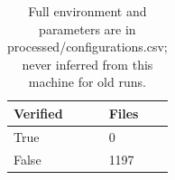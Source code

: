 \begin{table}[htbp]
\centering
\caption{Full environment and parameters are in processed/configurations.csv; never inferred from this machine for old runs.}
\label{tab:configuration-coverage}
\begin{tabular}{ll}
\hline
Verified & Files \\
\hline
True & 0 \\
False & 1197 \\
\hline
\end{tabular}
\end{table}
